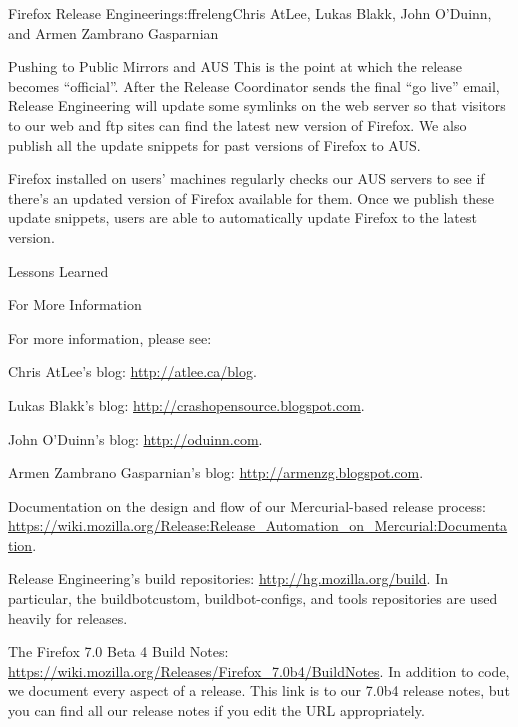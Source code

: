 \begin{aosachapter}{Firefox Release Engineering}{s:ffreleng}{Chris AtLee, Lukas Blakk, John O'Duinn, and Armen Zambrano Gasparnian}
\begin{aosasect1}{Pushing to Public Mirrors and AUS}
This is the point at which the release becomes ``official''. After the
Release Coordinator sends the final ``go live'' email, Release
Engineering will update some symlinks on the web server so that
visitors to our web and ftp sites can find the latest new version of
Firefox. We also publish all the update snippets for past versions of
Firefox to AUS. 

Firefox installed on users' machines regularly checks our AUS
servers to see if there's an updated version of Firefox available for
them. Once we publish these update snippets, users are able to
automatically update Firefox to the latest version.
  
\end{aosasect1}

\begin{aosasect1}{Lessons Learned}


\begin{aosasect2}{For More Information}

For more information, please see:

\begin{aosaitemize}  

\item Chris AtLee's blog: \url{http://atlee.ca/blog}.

\item Lukas Blakk's blog: \url{http://crashopensource.blogspot.com}.

\item John O'Duinn's blog: \url{http://oduinn.com}.

\item Armen Zambrano Gasparnian's blog: \url{http://armenzg.blogspot.com}.

\item Documentation on the design and flow of our Mercurial-based release process: \url{https://wiki.mozilla.org/Release:Release_Automation_on_Mercurial:Documentation}.

\item Release Engineering's build repositories:
  \url{http://hg.mozilla.org/build}.  In particular, the
  buildbotcustom, buildbot-configs, and tools repositories are used
  heavily for releases.

\item The Firefox 7.0 Beta 4 Build Notes:
  \url{https://wiki.mozilla.org/Releases/Firefox_7.0b4/BuildNotes}.
  In addition to code, we document every aspect of a release. This
  link is to our 7.0b4 release notes, but you can find all our release
  notes if you edit the URL appropriately.

\end{aosaitemize}

\end{aosasect2}

\end{aosasect1}

\end{aosachapter}
